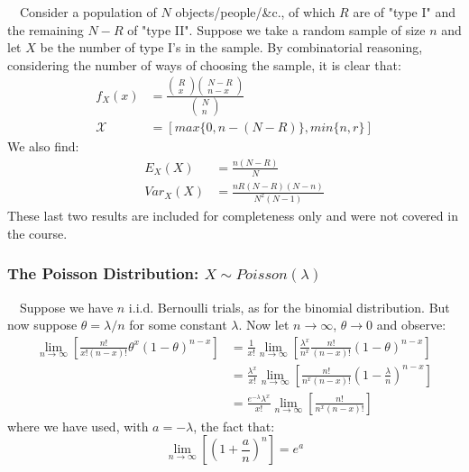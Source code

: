 \documentclass[12pt,a4paper]{article}
\begin{document}
$\quad$Consider a population of $N$ objects/people/\&c., of which $R$ are of "type I" and the remaining $N-R$ of "type II". Suppose we take a random sample of size $n$ and let $X$ be the number of type I's in the sample. By combinatorial reasoning, considering the number of ways of choosing the sample, it is clear that:
\begin{align*}
f_X(x) &= \frac{\left(\!\!\! \begin{array}{c} R\\ x\end{array}\!\!\!\right) \left(\!\!\!\begin{array}{c} N-R\\ n-x \end{array}\!\!\!\right)}{\left(\!\!\!\begin{array}{c} N\\ n\end{array}\!\!\!\right)}\\
\mathcal{X} &= [max\{0,n-(N-R)\},min\{n,r\}]
\end{align*}
We also find:
\begin{align*}
E_{X}(X) &= \frac{n(N-R)}{N}\\
Var_{X}(X) &= \frac{nR(N-R)(N-n)}{N^2(N-1)}
\end{align*}
These last two results are included for completeness only and were not covered in the course.

\subsubsection{The Poisson Distribution: $X \sim Poisson(\lambda)$}

$\quad$Suppose we have $n$ i.i.d. Bernoulli trials, as for the binomial distribution. But now suppose $\theta = \lambda/n$ for some constant $\lambda$. Now let $n \rightarrow \infty$, $\theta \rightarrow 0$ and observe:
\begin{align*}
\lim_{n \rightarrow \infty} \left[\frac{n!}{x! (n - x)!} \theta^x (1 - \theta)^{n - x}\right] &= \frac{1}{x!}\lim_{n \rightarrow \infty} \left[\frac{\lambda^x}{n^x} \frac{n!}{(n-x)!} (1-\theta)^{n-x}\right]\\
&= \frac{\lambda^x}{x!}\lim_{n\rightarrow\infty}\left[ \frac{n!}{n^x (n-x)!}\left(1 - \frac{\lambda}{n}\right)^{n-x}\right]\\
&= \frac{e^{-\lambda}\lambda^x}{x!}\lim_{n\rightarrow\infty} \left[\frac{n!}{n^x(n-x)!}\right]
\end{align*}
where we have used, with $a = -\lambda$, the fact that:
$$\lim_{n\rightarrow\infty}\left[\left(1+\frac{a}{n}\right)^{n}\right] = e^a$$
\end{document}
